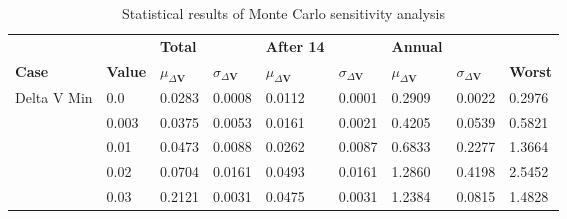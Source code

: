 \begin{table}[H]
\centering
\begin{tabular}{lllllllll}
 &  & \cellcolor[HTML]{EFEFEF}\textbf{Total} &  & \cellcolor[HTML]{EFEFEF}\textbf{After 14} & & \cellcolor[HTML]{EFEFEF}\textbf{Annual} & &\\
\rowcolor[HTML]{EFEFEF} 
\textbf{Case} & \textbf{Value} & \textbf{$\mu_{\Delta \boldsymbol{V}}$} & \textbf{$\sigma_{\Delta \boldsymbol{V}}$} & \textbf{$\mu_{\Delta \boldsymbol{V}}$} & \textbf{$\sigma_{\Delta \boldsymbol{V}}$} & \textbf{$\mu_{\Delta \boldsymbol{V}}$} & \textbf{$\sigma_{\Delta \boldsymbol{V}}$} & \textbf{Worst} \\ 
Delta V Min & 0.0 & 0.0283 & 0.0008 & 0.0112 & 0.0001 & 0.2909 & 0.0022 & 0.2976 \\ 
 & 0.003 & 0.0375 & 0.0053 & 0.0161 & 0.0021 & 0.4205 & 0.0539 & 0.5821 \\ 
 & 0.01 & 0.0473 & 0.0088 & 0.0262 & 0.0087 & 0.6833 & 0.2277 & 1.3664 \\ 
 & 0.02 & 0.0704 & 0.0161 & 0.0493 & 0.0161 & 1.2860 & 0.4198 & 2.5452 \\ 
 & 0.03 & 0.2121 & 0.0031 & 0.0475 & 0.0031 & 1.2384 & 0.0815 & 1.4828 \\ 
\end{tabular}
\caption{Statistical results of Monte Carlo sensitivity analysis}
\label{tab:SensitivityAnalysis}
\end{table}